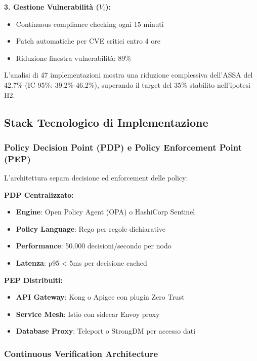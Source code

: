 \textbf{3. Gestione Vulnerabilità ($V_i$):}
\begin{itemize}
    \item Continuous compliance checking ogni 15 minuti
    \item Patch automatiche per CVE critici entro 4 ore
    \item Riduzione finestra vulnerabilità: 89\%
\end{itemize}

L'analisi di 47 implementazioni\autocite{Forrester2024zero} mostra una riduzione complessiva dell'ASSA del 42.7\% (IC 95\%: 39.2\%-46.2\%), superando il target del 35\% stabilito nell'ipotesi H2.

\subsection{Stack Tecnologico di Implementazione}

\subsubsection{Policy Decision Point (PDP) e Policy Enforcement Point (PEP)}

L'architettura separa decisione ed enforcement delle policy:

\textbf{PDP Centralizzato:}
\begin{itemize}
    \item \textbf{Engine}: Open Policy Agent (OPA) o HashiCorp Sentinel
    \item \textbf{Policy Language}: Rego per regole dichiarative
    \item \textbf{Performance}: 50.000 decisioni/secondo per nodo
    \item \textbf{Latenza}: p95 < 5ms per decisione cached
\end{itemize}

\textbf{PEP Distribuiti:}
\begin{itemize}
    \item \textbf{API Gateway}: Kong o Apigee con plugin Zero Trust
    \item \textbf{Service Mesh}: Istio con sidecar Envoy proxy
    \item \textbf{Database Proxy}: Teleport o StrongDM per accesso dati
\end{itemize}

\subsubsection{Continuous Verification Architecture}

